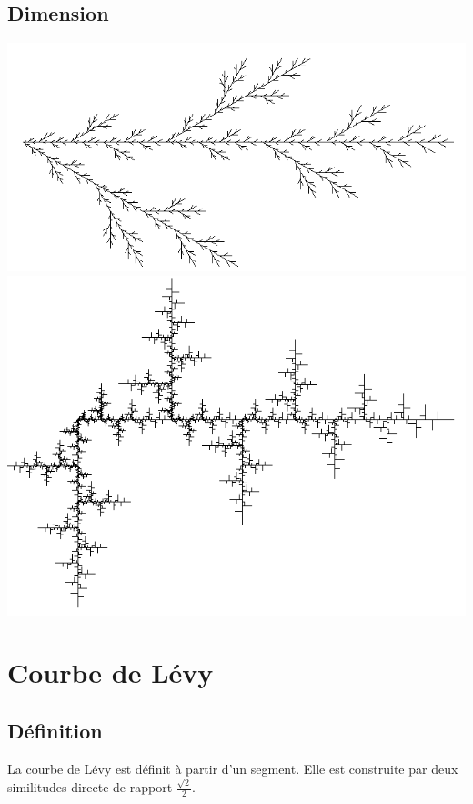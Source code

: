 \documentclass[a4paper, 12pt]{report}
\begin{document}
			\subsection{Dimension}
			\begin{center}
				\includegraphics[scale=0.3]{Images/hata1}
				\includegraphics[scale=0.3]{Images/hata2}
			\end{center}

		\newpage
		\section{Courbe de Lévy}
			\subsection{Définition}
			La courbe de Lévy est définit à partir d'un segment. Elle est construite par deux similitudes directe de rapport $\frac{\sqrt{2}}{2}$.
			
\end{document}

